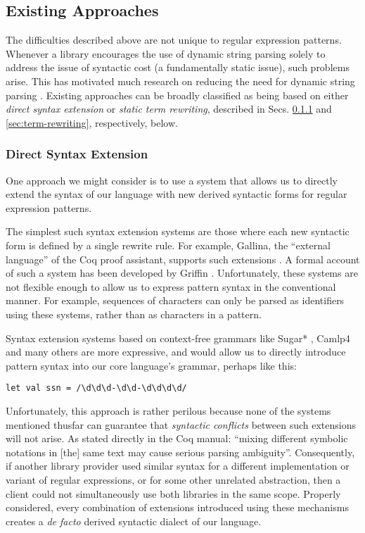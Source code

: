	\subsection{Existing Approaches}\label{sec:syntax-existing} The difficulties described above are not unique to regular expression patterns. Whenever a library  encourages the use of dynamic string parsing solely to address the issue of syntactic cost (a fundamentally static issue), such problems arise. %
	This has motivated much research on reducing the need for dynamic string parsing \cite{Bravenboer:2007:PIA:1289971.1289975}. Existing approaches can be broadly classified as being based on either \emph{direct syntax extension} or \emph{static term rewriting}, described in Secs. \ref{sec:syntax-extension} and \ref{sec:term-rewriting}, respectively, below.%

\subsubsection{Direct Syntax Extension}\label{sec:syntax-extension}
One approach we might consider is to use a system that allows us to directly extend the syntax of our language with new derived syntactic forms for regular expression patterns.%

The simplest such syntax extension systems are those where each new syntactic form is defined by a single rewrite rule. For example, Gallina, the ``external language'' of the Coq proof assistant, supports such extensions \cite{Coq:manual}. A formal account of such a system has been developed by Griffin \cite{5134}. Unfortunately, these systems are not flexible enough to allow us to express pattern syntax in the conventional manner. For example, sequences of characters  can only be parsed as identifiers using these systems, rather than as characters in a pattern. 

Syntax extension systems based on context-free grammars like  Sugar* \cite{erdweg2013framework}, Camlp4 \cite{ocaml-manual} and many others are more expressive, and would allow us to directly introduce pattern syntax into our core language's grammar, perhaps like this:
\begin{lstlisting}[numbers=none]
let val ssn = /\d\d\d-\d\d-\d\d\d\d/
\end{lstlisting}

Unfortunately, this approach is rather perilous because none of the systems mentioned thusfar can guarantee that \emph{syntactic conflicts} between such extensions will not arise. As stated directly in the  Coq manual: ``mixing different symbolic notations in [the] same text may cause serious parsing ambiguity''. Consequently, if another library provider used similar syntax for a different implementation or variant of regular expressions, or for some other unrelated abstraction, then a client could not simultaneously use both libraries in the same scope. Properly considered, every combination of extensions introduced using these mechanisms creates a \emph{de facto} derived syntactic dialect of our language. %

